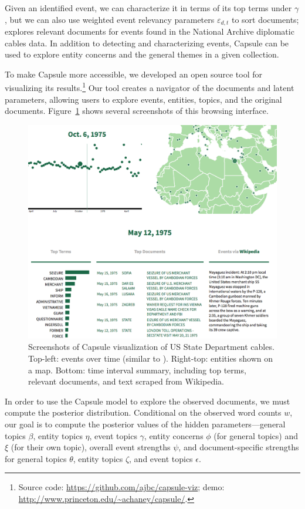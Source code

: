 Given an identified event, we can characterize it in terms of its top terms under $\gamma$, but we can also use weighted event relevancy parameters $\varepsilon_{d,t}$ to sort documents;  explores relevant documents for events found in the National Archive diplomatic cables data.
In addition to detecting and characterizing events, Capsule can be used to explore entity concerns and the general themes in a given collection.

To make Capsule more accessible, we developed an open source tool for visualizing its results.\footnote{Source code: \url{https://github.com/ajbc/capsule-viz}; demo: \url{http://www.princeton.edu/~achaney/capsule/}.}  Our tool creates a navigator of the documents and latent parameters, allowing users to explore events, entities, topics, and the original documents.  Figure~\ref{fig:viz} shows several screenshots of this browsing interface.

\begin{figure}
\centering
\includegraphics[width=\linewidth]{fig/viz.png}
\caption{Screenshots of Capsule visualization of US State Department cables.  Top-left: events over time (similar to ).  Right-top: entities shown on a map.  Bottom: time interval summary, including top terms, relevant documents, and text scraped from Wikipedia.}
\label{fig:viz}
\end{figure}


In order to use the Capsule model to explore the observed documents, we must compute the posterior distribution.  Conditional on the observed word counts $w$, our goal is to compute the posterior values of the hidden parameters---general topics $\beta$, entity topics $\eta$, event topics $\gamma$, entity concerns $\phi$ (for general topics) and $\xi$ (for their own topic), overall event strengths $\psi$, and document-specific strengths for general topics $\theta$, entity topics $\zeta$, and event topics $\epsilon$.


